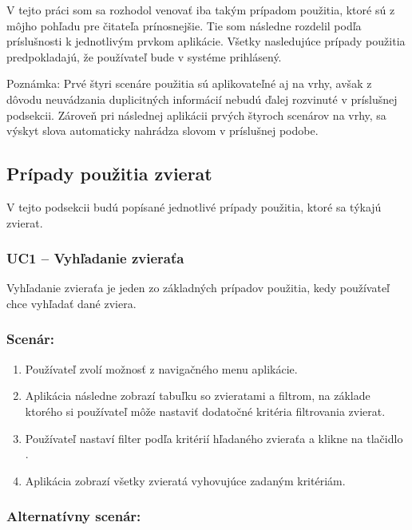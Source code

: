 V tejto práci som sa rozhodol venovať iba takým prípadom použitia, ktoré sú z môjho pohľadu pre čitateľa prínosnejšie. Tie som následne rozdelil podľa príslušnosti k jednotlivým prvkom aplikácie. Všetky nasledujúce prípady použitia predpokladajú, že používateľ bude v systéme prihlásený.

\hfill \break
Poznámka: Prvé štyri scenáre použitia sú aplikovateľné aj na vrhy, avšak z dôvodu neuvádzania duplicitných informácií nebudú ďalej rozvinuté v príslušnej podsekcii. Zároveň pri následnej aplikácii prvých štyroch scenárov na vrhy, sa výskyt slova  automaticky nahrádza slovom  v príslušnej podobe.

\subsection{Prípady použitia zvierat}
V tejto podsekcii budú popísané jednotlivé prípady použitia, ktoré sa týkajú zvierat.

\subsubsection{UC1 -- Vyhľadanie zvieraťa}\label{uc1}

Vyhľadanie zvieraťa je jeden zo základných prípadov použitia, kedy používateľ chce vyhľadať dané zviera.

\subsubsection*{Scenár:}

\begin{enumerate}
	\item Používateľ zvolí možnosť  z navigačného menu aplikácie.
	\item Aplikácia následne zobrazí tabuľku so zvieratami a filtrom, na základe ktorého si používateľ môže nastaviť dodatočné kritéria filtrovania zvierat.
	\item Používateľ nastaví filter podľa kritérií hľadaného zvieraťa a klikne na tlačidlo .
	\item Aplikácia zobrazí všetky zvieratá vyhovujúce zadaným kritériám.
\end{enumerate}

\subsubsection*{Alternatívny scenár:}

